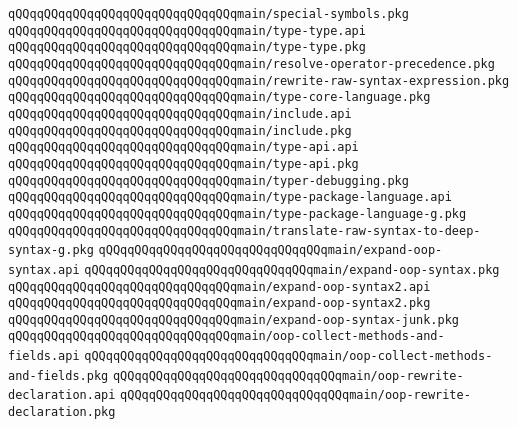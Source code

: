 \verb|qQQqqQQqqQQqqQQqqQQqqQQqqQQqqQQqmain/special-symbols.pkg|\newline
\verb|qQQqqQQqqQQqqQQqqQQqqQQqqQQqqQQqmain/type-type.api|\newline
\verb|qQQqqQQqqQQqqQQqqQQqqQQqqQQqqQQqmain/type-type.pkg|\newline
\verb|qQQqqQQqqQQqqQQqqQQqqQQqqQQqqQQqmain/resolve-operator-precedence.pkg|\newline
\verb|qQQqqQQqqQQqqQQqqQQqqQQqqQQqqQQqmain/rewrite-raw-syntax-expression.pkg|\newline
\verb|qQQqqQQqqQQqqQQqqQQqqQQqqQQqqQQqmain/type-core-language.pkg|\newline
\verb|qQQqqQQqqQQqqQQqqQQqqQQqqQQqqQQqmain/include.api|\newline
\verb|qQQqqQQqqQQqqQQqqQQqqQQqqQQqqQQqmain/include.pkg|\newline
\verb|qQQqqQQqqQQqqQQqqQQqqQQqqQQqqQQqmain/type-api.api|\newline
\verb|qQQqqQQqqQQqqQQqqQQqqQQqqQQqqQQqmain/type-api.pkg|\newline
\verb|qQQqqQQqqQQqqQQqqQQqqQQqqQQqqQQqmain/typer-debugging.pkg|\newline
\verb|qQQqqQQqqQQqqQQqqQQqqQQqqQQqqQQqmain/type-package-language.api|\newline
\verb|qQQqqQQqqQQqqQQqqQQqqQQqqQQqqQQqmain/type-package-language-g.pkg|\newline
\verb|qQQqqQQqqQQqqQQqqQQqqQQqqQQqqQQqmain/translate-raw-syntax-to-deep-syntax-g.pkg|\newline
\verb|qQQqqQQqqQQqqQQqqQQqqQQqqQQqqQQqmain/expand-oop-syntax.api|\newline
\verb|qQQqqQQqqQQqqQQqqQQqqQQqqQQqqQQqmain/expand-oop-syntax.pkg|\newline
\verb|qQQqqQQqqQQqqQQqqQQqqQQqqQQqqQQqmain/expand-oop-syntax2.api|\newline
\verb|qQQqqQQqqQQqqQQqqQQqqQQqqQQqqQQqmain/expand-oop-syntax2.pkg|\newline
\verb|qQQqqQQqqQQqqQQqqQQqqQQqqQQqqQQqmain/expand-oop-syntax-junk.pkg|\newline
\verb|qQQqqQQqqQQqqQQqqQQqqQQqqQQqqQQqmain/oop-collect-methods-and-fields.api|\newline
\verb|qQQqqQQqqQQqqQQqqQQqqQQqqQQqqQQqmain/oop-collect-methods-and-fields.pkg|\newline
\verb|qQQqqQQqqQQqqQQqqQQqqQQqqQQqqQQqmain/oop-rewrite-declaration.api|\newline
\verb|qQQqqQQqqQQqqQQqqQQqqQQqqQQqqQQqmain/oop-rewrite-declaration.pkg|\newline
